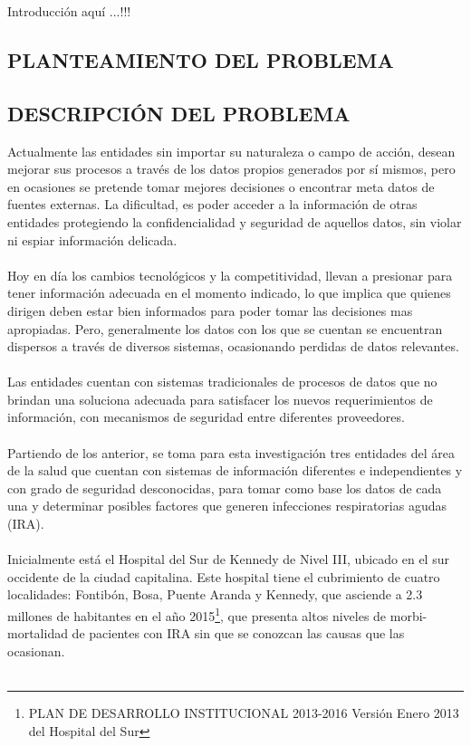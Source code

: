 \documentclass[a4paper,openright,12pt]{book}
\theoremstyle{definition}
\theoremstyle{remark}
\begin{document}
Introducción aquí ...!!!

\clearpage

\begin{center}
 \chapter{PLANTEAMIENTO DEL PROBLEMA}\label{cap.planteamiento}
 \end{center}
 

\section{DESCRIPCIÓN DEL PROBLEMA}

Actualmente las entidades sin importar su naturaleza o campo de acción, desean mejorar sus procesos a través de los datos propios generados por sí mismos, pero en ocasiones  se pretende tomar mejores decisiones o encontrar meta datos de fuentes externas. La dificultad, es poder acceder a la información de otras entidades protegiendo la confidencialidad y seguridad de aquellos datos, sin violar ni espiar información delicada.\\\\
Hoy en día los cambios tecnológicos y la competitividad, llevan a presionar para tener información adecuada en el momento indicado, lo que implica que quienes dirigen deben estar bien informados para poder tomar las decisiones mas apropiadas. Pero, generalmente los datos con los que se cuentan se encuentran dispersos a través de diversos sistemas, ocasionando perdidas de datos relevantes.\\\\
Las entidades cuentan con sistemas tradicionales de procesos de datos que no brindan una soluciona adecuada para satisfacer los nuevos requerimientos de información, con mecanismos de seguridad entre diferentes proveedores.\\\\
Partiendo de los anterior, se toma para esta investigación tres entidades del área de la salud que cuentan con sistemas de información diferentes e independientes y con grado de seguridad desconocidas, para tomar como base los datos de cada una y determinar posibles factores que generen infecciones respiratorias agudas (IRA).\\\\
Inicialmente está el Hospital del Sur de Kennedy de Nivel III, ubicado en el sur occidente de la ciudad capitalina. Este hospital tiene el cubrimiento de cuatro localidades: Fontibón, Bosa, Puente Aranda y Kennedy, que asciende a 2.3 millones de habitantes en el año 2015\footnote{PLAN DE DESARROLLO INSTITUCIONAL 2013-2016 Versión Enero 2013 del Hospital del Sur}, que presenta altos niveles de morbi-mortalidad de pacientes con IRA sin que se conozcan las causas que las ocasionan.\\\\
\end{document}
